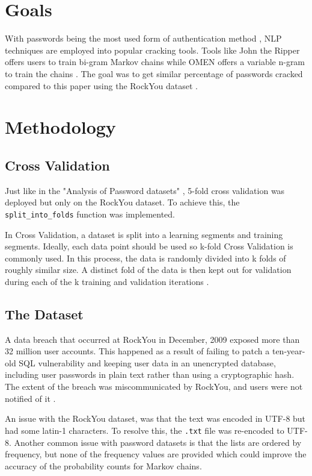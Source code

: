 \section{Goals}
With passwords being the most used form of authentication method \cite{Papathanasaki},  NLP techniques are employed into popular cracking tools. Tools like John the Ripper offers users to train bi-gram Markov chains while OMEN offers a variable n-gram to train the chains \cite{duermuth:hal-01112124}. The goal was to get similar percentage of passwords cracked compared to this paper \cite{Max} using the RockYou dataset \cite{Brannon}.
\section{Methodology}
\subsection{Cross Validation}
Just like in the "Analysis of Password datasets" \cite{Max}, 5-fold cross validation was deployed but only on the RockYou dataset. To achieve this, the \verb|split_into_folds| function was implemented. 

In Cross Validation, a dataset is split into a learning segments and training segments. Ideally, each data point should be used so k-fold Cross Validation is commonly used. In this process, the data is randomly divided into k folds of roughly similar size. A distinct fold of the data is then kept out for validation during each of the k training and validation iterations \cite{Refaeilzadeh2009}.
\subsection{The Dataset}
A data breach that occurred at RockYou in December, 2009 exposed more than 32 million user accounts. This happened as a result of failing to patch a ten-year-old SQL vulnerability and keeping user data in an unencrypted database, including user passwords in plain text rather than using a cryptographic hash. The extent of the breach was miscommunicated by RockYou, and users were not notified of it \cite{techcrunchRockYouHack}.

An issue with the RockYou dataset, was that the text was encoded in UTF-8 but had some latin-1 characters. To resolve this, the \verb|.txt| file was re-encoded to UTF-8. Another common issue with password datasets is that the lists are ordered by frequency, but none of the frequency values are provided which could improve the accuracy of the probability counts for Markov chains. 
